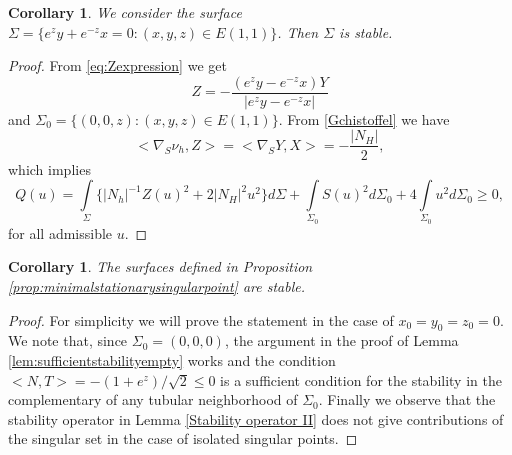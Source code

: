 \documentclass[10pt]{amsart}
\newtheorem{corollary}[theorem]{Corollary}
\theoremstyle{definition}
\theoremstyle{remark}
\numberwithin{equation}{section}
\begin{document}
\begin{corollary} We consider the surface ${\Sigma}=\{e^z y+e^{-z}x=0: (x,y,z)\in {E(1,1)}\}$. Then ${\Sigma}$ is stable. 

\end{corollary}

\begin{proof} From \eqref{eq:Zexpression} we get
\[
Z=-\frac{(e^z y-e^{-z}x)Y}{|e^z y-e^{-z}x|}
\]
and ${\Sigma}_0=\{(0,0,z):(x,y,z)\in {E(1,1)}\}$. From \eqref{Gchistoffel} we have
\[
{\big<{{\nabla}_S \nu_h,Z}\big>}={\big<{{\nabla}_S Y,X}\big>}=-\frac{|N_{H}|}{2},
\]
which implies
\[
Q(u)=\int\limits_{\Sigma}\{|N_h|^{-1}Z(u)^2+2{|N_{H}|}^2 u^2\}d{\Sigma}+\int\limits_{{\Sigma}_0} S(u)^2  d{\Sigma}_0+ 4\int\limits_{{\Sigma}_0} u^2  d{\Sigma}_0{\geqslant} 0,
\]
for all admissible $u$.
 \end{proof}
 
 
 
 \begin{corollary} The surfaces defined in Proposition \ref{prop:minimalstationarysingularpoint} are stable. 
\end{corollary}

\begin{proof} For simplicity we will prove the statement in the case of $x_0=y_0=z_0=0$. We note that, since ${\Sigma}_0=(0,0,0)$, the argument in the proof of Lemma \ref{lem:sufficientstabilityempty} works and  the condition ${\big<{N,T}\big>}=-(1+e^z)/\sqrt{2}{\leqslant} 0$ is a sufficient condition for the stability in the complementary of any tubular neighborhood  of  ${\Sigma}_0$. Finally we observe that the stability operator in Lemma \ref{Stability operator II} does not give contributions of the singular set in the case of isolated singular points. 
 \end{proof}
\end{document}
